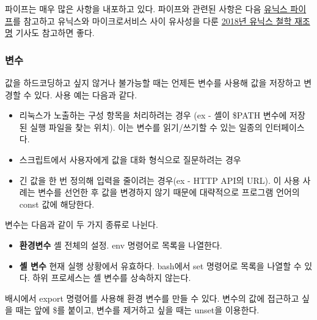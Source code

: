 \begin{flushleft}
    파이프는 매우 많은 사항을 내포하고 있다.
    파이프와 관련된 사항은 다음 \href{https://web.cse.ohio-state.edu/~mamrak.1/CIS762/pipes_lab_notes.html}{유닉스 파이프}를 참고하고
    유닉스와 마이크로서비스 사이 유사성을 다룬 \href{https://opensource.com/article/18/11/revisiting-unix-philosophy-2018}{2018년 유닉스 철학 재조명} 기사도 참고하면 좋다.
\end{flushleft}


\subsubsection*{변수}
\begin{flushleft}
    값을 하드코딩하고 싶지 않거나 불가능할 때는 언제든 변수를 사용해 값을 저장하고 변경할 수 있다.
    사용 예는 다음과 같다.
    \begin{itemize}
        \item 리눅스가 노출하는 구성 항목을 처리하려는 경우
            (ex - 셸이 \$PATH 변수에 저장된 실행 파일을 찾는 위치).
            이는 변수를 읽기/쓰기할 수 있는 일종의 인터페이스다.
        \item 스크립트에서 사용자에게 값을 대화 형식으로 질문하려는 경우 
        \item 긴 값을 한 번 정의해 입력을 줄이려는 경우(ex - HTTP API의 URL).
            이 사용 사례는 변수를 선언한 후 값을 변경하지 않기 때문에
            대략적으로 프로그램 언어의 const 값에 해당한다.
    \end{itemize}
\end{flushleft}

\begin{flushleft}
    변수는 다음과 같이 두 가지 종류로 나뉜다.
    \begin{itemize}
        \item \textbf{환경변수}\newline
            셸 전체의 설정.
            env 명령어로 목록을 나열한다.
        \item \textbf{셸 변수}\newline
            현재 실행 상황에서 유효하다.
            bash에서 set 명령어로 목록을 나열할 수 있다.
            하위 프로세스는 셸 변수를 상속하지 않는다.
    \end{itemize}
\end{flushleft}

\begin{flushleft}
    배시에서 export 명령어를 사용해 환경 변수를 만들 수 있다.
    변수의 값에 접근하고 싶을 때는 앞에 \$를 붙이고,
    변수를 제거하고 싶을 때는 unset을 이용한다.
\end{flushleft}

